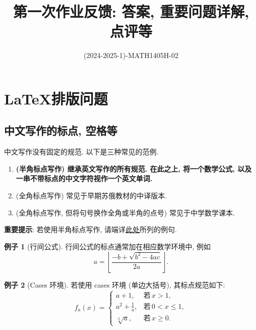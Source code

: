 \documentclass[11pt]{ctexart}
\title{第一次作业反馈: 答案, 重要问题详解, 点评等}
\author{(2024-2025-1)-MATH1405H-02}
\theoremstyle{definition}
\numberwithin{equation}{section}
\theoremstyle{definition}
\newtheorem*{example}{例子}
\theoremstyle{remark}
\begin{document}
\maketitle

\tableofcontents

\newpage

\section{\LaTeX 排版问题}

\subsection{中文写作的标点, 空格等}

中文写作没有固定的规范. 以下是三种常见的范例. 
\begin{enumerate}
    \item \textbf{(半角标点写作) 继承英文写作的所有规范. 在此之上, 将一个数学公式, 以及一串不带标点的中文字符视作一个英文单词.} 
    \item (全角标点写作) 常见于早期苏俄教材的中译版本. 
    \item (全角标点写作, 但将句号换作全角或半角的点号) 常见于中学数学课本. 
\end{enumerate}

\begin{pinked}
    \textbf{重要提示}: 若使用半角标点写作, 请端详\href{https://oc.sjtu.edu.cn/courses/72790/assignments/302404}{此处}所列的例句. 
\end{pinked}

\begin{example}[行间公式]
    行间公式的标点通常加在相应数学环境中, 例如 
    \begin{equation}
        a=\left\lfloor\frac{-b+ \sqrt {b^2-4ac}}{2a}\right\rfloor. 
    \end{equation}
\end{example}

\begin{example}[Cases 环境]
    若使用 cases 环境 (单边大括号), 其标点规范如下: 
    \begin{equation}
        f_a(x)=\begin{cases}
            a+1,&\text{若}\,x>1, \\[6pt]
            a^2+\frac 1a,&\text{若}\,0<x\leq 1, \\[6pt]
            \sqrt[3]a,&\text{若}\,x\geq 0. 
        \end{cases}
    \end{equation}
\end{example}
\end{document}
